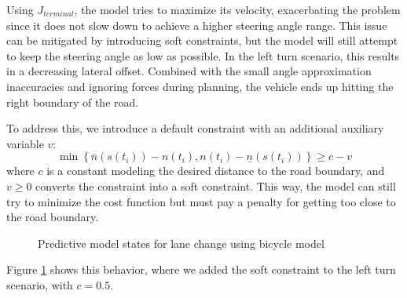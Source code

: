 Using $J_{terminal}$, the model tries to maximize its velocity, exacerbating the problem since it does not slow down to achieve a higher steering
angle range.
This issue can be mitigated by introducing soft constraints, but the model will still attempt to keep the steering angle as low as possible.
In the left turn scenario, this results in a decreasing lateral offset.
Combined with the small angle approximation inaccuracies and ignoring forces during planning, the vehicle ends up hitting the right boundary of the
road.

To address this, we introduce a default constraint with an additional auxiliary variable $v$: \[ \min \left\{ \overline{n}(s(t_i)) - n(t_i), n(t_i) -
	\underline{n}(s(t_i)) \right\} \geq c - v \] where $c$ is a constant modeling the desired distance to the road boundary, and $v \geq 0$ converts the
constraint into a soft constraint.
This way, the model can still try to minimize the cost function but must pay a penalty for getting too close to the road boundary.
\begin{figure}[h]
	\centering
	\caption{Predictive model states for lane change using bicycle model}
	\label{fig:left_turn_bicycle_model}
\end{figure}
Figure \ref{fig:left_turn_bicycle_model} shows this behavior, where we added the soft constraint to the left turn scenario, with $c=0.5$.



